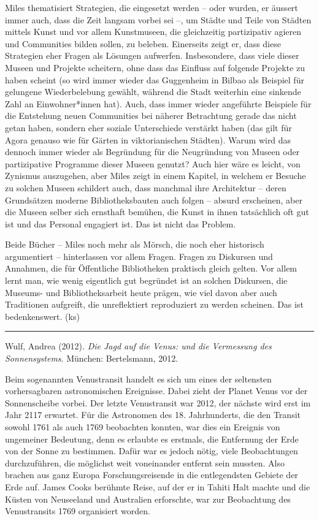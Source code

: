 \documentclass[a4paper,
fontsize=11pt,
oneside,
numbers=noperiodatend,
parskip=half-,
bibliography=totoc,
final
]{scrartcl}
\begin{document}
Miles thematisiert Strategien, die eingesetzt werden -- oder wurden, er
äussert immer auch, dass die Zeit langsam vorbei sei --, um Städte und
Teile von Städten mittels Kunst und vor allem Kunstmuseen, die
gleichzeitig partizipativ agieren und Communities bilden sollen, zu
beleben. Einerseits zeigt er, dass diese Strategien eher Fragen als
Lösungen aufwerfen. Insbesondere, dass viele dieser Museen und Projekte
scheitern, ohne dass das Einfluss auf folgende Projekte zu haben scheint
(so wird immer wieder das Guggenheim in Bilbao als Beispiel für
gelungene Wiederbelebung gewählt, während die Stadt weiterhin eine
sinkende Zahl an Einwohner*innen hat). Auch, dass immer wieder
angeführte Beispiele für die Entstehung neuen Communities bei näherer
Betrachtung gerade das nicht getan haben, sondern eher soziale
Unterschiede verstärkt haben (das gilt für Agora genauso wie für Gärten
in viktorianischen Städten). Warum wird das dennoch immer wieder als
Begründung für die Neugründung von Museen oder partizipative Programme
dieser Museen genutzt? Auch hier wäre es leicht, von Zynismus
auszugehen, aber Miles zeigt in einem Kapitel, in welchem er Besuche zu
solchen Museen schildert auch, dass manchmal ihre Architektur -- deren
Grundsätzen moderne Bibliotheksbauten auch folgen -- absurd erscheinen,
aber die Museen selber sich ernsthaft bemühen, die Kunst in ihnen
tatsächlich oft gut ist und das Personal engagiert ist. Das ist nicht
das Problem.

Beide Bücher -- Miles noch mehr als Mörsch, die noch eher historisch
argumentiert -- hinterlassen vor allem Fragen. Fragen zu Diskursen und
Annahmen, die für Öffentliche Bibliotheken praktisch gleich gelten. Vor
allem lernt man, wie wenig eigentlich gut begründet ist an solchen
Diskursen, die Museums- und Bibliotheksarbeit heute prägen, wie viel
davon aber auch Traditionen aufgreift, die unreflektiert reproduziert zu
werden scheinen. Das ist bedenkenswert. (ks)

\begin{center}\rule{0.5\linewidth}{0.5pt}\end{center}

Wulf, Andrea (2012). \emph{Die Jagd auf die Venus: und die Vermessung
des Sonnensystems}. München: Bertelsmann, 2012.

Beim sogenannten Venustransit handelt es sich um eines der seltensten
vorhersagbaren astronomischen Ereignisse. Dabei zieht der Planet Venus
vor der Sonnenscheibe vorbei. Der letzte Venustransit war 2012, der
nächste wird erst im Jahr 2117 erwartet. Für die Astronomen des 18.
Jahrhunderts, die den Transit sowohl 1761 als auch 1769 beobachten
konnten, war dies ein Ereignis von ungemeiner Bedeutung, denn es
erlaubte es erstmals, die Entfernung der Erde von der Sonne zu
bestimmen. Dafür war es jedoch nötig, viele Beobachtungen durchzuführen,
die möglichst weit voneinander entfernt sein mussten. Also brachen aus
ganz Europa Forschungsreisende in die entlegendsten Gebiete der Erde
auf. James Cooks berühmte Reise, auf der er in Tahiti Halt machte und
die Küsten von Neuseeland und Australien erforschte, war zur Beobachtung
des Venustransits 1769 organisiert worden.
\end{document}

